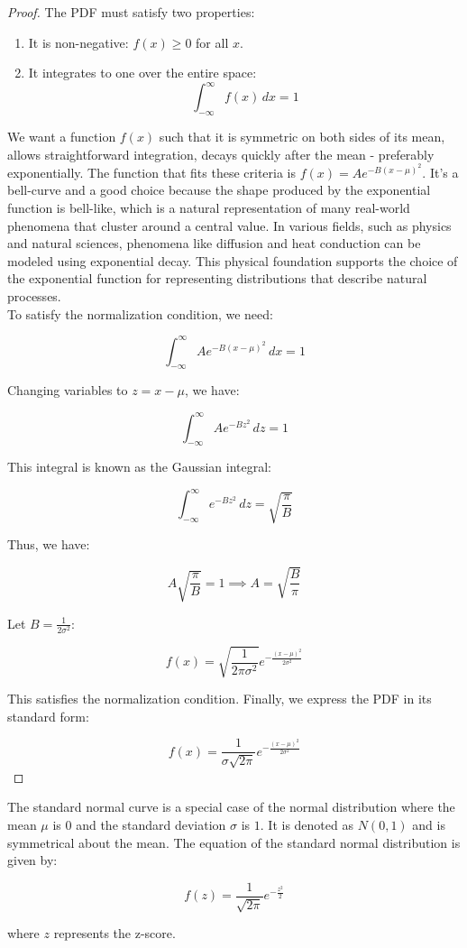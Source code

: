 \begin{proof}
    The PDF must satisfy two properties:
\begin{enumerate}
    \item It is non-negative: \(f(x) \geq 0\) for all \(x\).
    \item It integrates to one over the entire space:
    \[
    \int_{-\infty}^{\infty} f(x) \, dx = 1
    \]
\end{enumerate}

We want a function \(f(x)\) such that it is symmetric on both sides of its mean, allows straightforward integration, decays quickly after the mean - preferably exponentially. The function that fits these criteria is $f(x) = A e^{-B(x - \mu)^2}$. It's a bell-curve and a good choice because the shape produced by the exponential function is bell-like, which is a natural representation of many real-world phenomena that cluster around a central value. In various fields, such as physics and natural sciences, phenomena like diffusion and heat conduction can be modeled using exponential decay. This physical foundation supports the choice of the exponential function for representing distributions that describe natural processes.\\

To satisfy the normalization condition, we need:

\[
\int_{-\infty}^{\infty} A e^{-B(x - \mu)^2} \, dx = 1
\]

Changing variables to \(z = x - \mu\), we have:

\[
\int_{-\infty}^{\infty} A e^{-Bz^2} \, dz = 1
\]

This integral is known as the Gaussian integral:

\[
\int_{-\infty}^{\infty} e^{-Bz^2} \, dz = \sqrt{\frac{\pi}{B}}
\]

Thus, we have:

\[
A \sqrt{\frac{\pi}{B}} = 1 \implies A = \sqrt{\frac{B}{\pi}}
\]

Let \(B = \frac{1}{2\sigma^2}\):

\[
f(x) = \sqrt{\frac{1}{2\pi \sigma^2}} e^{-\frac{(x - \mu)^2}{2\sigma^2}}
\]

This satisfies the normalization condition. Finally, we express the PDF in its standard form:

\[
f(x) = \frac{1}{\sigma \sqrt{2\pi}} e^{-\frac{(x - \mu)^2}{2\sigma^2}}
\]
\end{proof}

\begin{definition}
    The standard normal curve is a special case of the normal distribution where the mean \(\mu\) is \(0\) and the standard deviation \(\sigma\) is \(1\). It is denoted as \(N(0, 1)\) and is symmetrical about the mean. The equation of the standard normal distribution is given by:

    \[
f(z) = \frac{1}{\sqrt{2\pi}} e^{-\frac{z^2}{2}}
\]

where \(z\) represents the z-score.
\end{definition}

